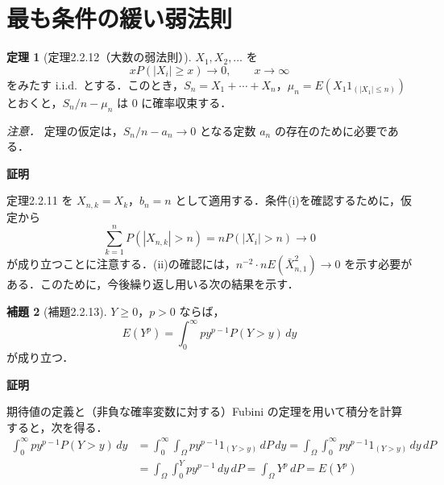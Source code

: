 \documentclass[dvipdfmx]{jsarticle}
\makeatletter
\numberwithin{equation}{section}
\theoremstyle{definition}
\newtheorem{thm}{定理}[section]
\newtheorem{lem}[thm]{補題}
\renewenvironment{proof}[1][\proofname]{\par
  \pushQED{\qed}%
  \normalfont \topsep6\p@\@plus6\p@\relax
  \trivlist
  \item\relax
  {\bfseries
  #1\@addpunct{.}}\hspace\labelsep\ignorespaces
}{%
  \popQED\endtrivlist\@endpefalse
}
\renewcommand{\proofname}{証明}
\newcommand{\0}{\bm{0}}
\newcommand{\1}{\bm{1}}
\makeatother
\begin{document}
\section{最も条件の緩い弱法則}

\begin{thm}[定理2.2.12（大数の弱法則）]
$X_1, X_2, \dots$ を
\[
  xP(|X_i| \ge x) \to 0, \qquad x \to \infty
\]
をみたす i.i.d.\ とする．このとき，$S_n = X_1 + \cdots + X_n$，$\mu_n = E(X_1 1_{(|X_1| \le n)})$ とおくと，$S_n/n - \mu_n$ は $0$ に確率収束する．
\end{thm}

\emph{注意．} 定理の仮定は，$S_n/n - a_n \to 0$ となる定数 $a_n$ の存在のために必要である．

\begin{proof}
定理2.2.11 を $X_{n,k} = X_k$，$b_n = n$ として適用する．条件(i)を確認するために，仮定から
\[
  \sum_{k=1}^n P(|X_{n,k}| > n) = n P(|X_i| > n) \to 0
\]
が成り立つことに注意する．(ii)の確認には，$n^{-2} \cdot n E(\bar{X}_{n,1}^2) \to 0$ を示す必要がある．このために，今後繰り返し用いる次の結果を示す．
\end{proof}

\begin{lem}[補題2.2.13]
$Y \ge 0$，$p > 0$ ならば，
\[
  E(Y^p) = \int_0^\infty p y^{p-1} P(Y > y)\, dy
\]
が成り立つ．
\end{lem}

\begin{proof}
期待値の定義と（非負な確率変数に対する）Fubini の定理を用いて積分を計算すると，次を得る．
\begin{align*}
  \int_0^\infty p y^{p-1} P(Y > y)\, dy
  &= \int_0^\infty \int_\Omega p y^{p-1} 1_{(Y>y)}\, dP\, dy
   = \int_\Omega \int_0^\infty p y^{p-1} 1_{(Y>y)}\, dy\, dP \\
  &= \int_\Omega \int_0^Y p y^{p-1}\, dy\, dP
   = \int_\Omega Y^p\, dP = E(Y^p)
\end{align*}
\end{proof}
\end{document}
